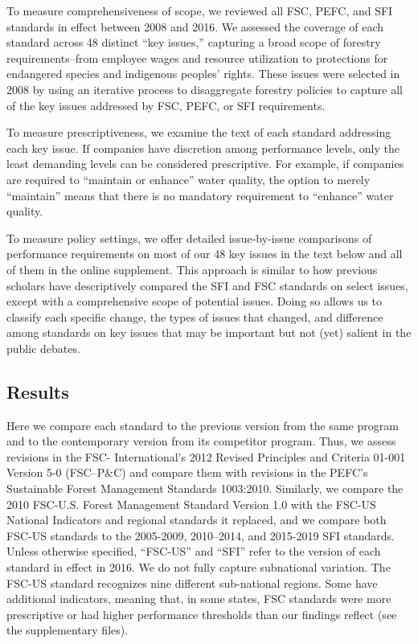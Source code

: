 \documentclass[
      12pt,
            Review ]{article}
\begin{document}
To measure comprehensiveness of scope, we reviewed all FSC, PEFC, and SFI standards in effect between 2008 and 2016. We assessed the coverage of each standard across 48 distinct ``key issues,'' capturing a broad scope of forestry requirements--from employee wages and resource utilization to protections for endangered species and indigenous peoples' rights. These issues were selected in 2008 by \citet{McDermott2010} using an iterative process to disaggregate forestry policies to capture all of the key issues addressed by FSC, PEFC, or SFI requirements.

To measure prescriptiveness, we examine the text of each standard addressing each key issue. If companies have discretion among performance levels, only the least demanding levels can be considered prescriptive. For example, if companies are required to ``maintain or enhance'' water quality, the option to merely ``maintain'' means that there is no mandatory requirement to ``enhance'' water quality.

To measure policy settings, we offer detailed issue-by-issue comparisons of performance requirements on most of our 48 key issues in the text below and all of them in the online supplement. This approach is similar to how previous scholars have descriptively compared the SFI and FSC standards on select issues, except with a comprehensive scope of potential issues. Doing so allows us to classify each specific change, the types of issues that changed, and difference among standards on key issues that may be important but not (yet) salient in the public debates.

\hypertarget{results}{%
\subsection{Results}\label{results}}

Here we compare each standard to the previous version from the same program and to the contemporary version from its competitor program. Thus, we assess revisions in the FSC- International's 2012 Revised Principles and Criteria 01-001 Version 5-0 (FSC--P\&C) and compare them with revisions in the PEFC's Sustainable Forest Management Standards 1003:2010. Similarly, we compare the 2010 FSC-U.S. Forest Management Standard Version 1.0 with the FSC-US National Indicators and regional standards it replaced, and we compare both FSC-US standards to the 2005-2009, 2010--2014, and 2015-2019 SFI standards. Unless otherwise specified, ``FSC-US'' and ``SFI'' refer to the version of each standard in effect in 2016. We do not fully capture subnational variation. The FSC-US standard recognizes nine different sub-national regions. Some have additional indicators, meaning that, in some states, FSC standards were more prescriptive or had higher performance thresholds than our findings reflect (see the supplementary files).
\end{document}
